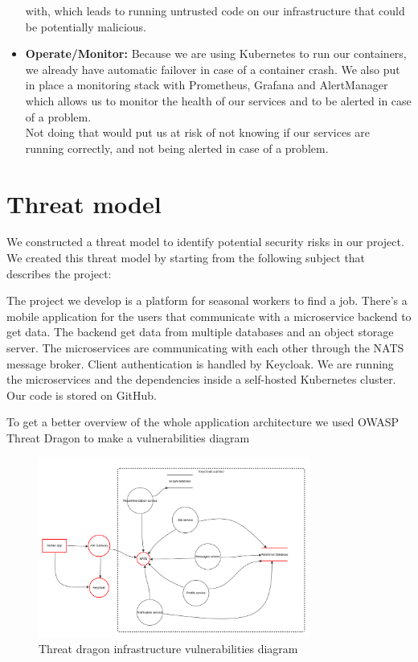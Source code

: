 \documentclass[12pt,x11names]{article}
\begin{document}
\begin{itemize}
    with, which leads to running untrusted code on our infrastructure that could be
    potentially malicious.
    \item \textbf{Operate/Monitor:} Because we are using Kubernetes to run our
    containers, we already have automatic failover in case of a container crash. We
    also put in place a monitoring stack with Prometheus, Grafana and AlertManager which
    allows us to monitor the health of our services and to be alerted in case of a problem.
    \medskip \\
    Not doing that would put us at risk of not knowing if our services are running
    correctly, and not being alerted in case of a problem.
\end{itemize}

\section{Threat model}

We constructed a threat model to identify potential security risks in our project. We 
created this threat model by starting from the following subject that describes the 
project:

\medskip
The project we develop is a platform for seasonal workers to find a job. There's a mobile 
application for the users that communicate with a microservice backend to get data. The 
backend get data from multiple databases and an object storage server. The microservices
are communicating with each other through the NATS message broker. Client authentication 
is handled by Keycloak. We are running the microservices and the dependencies inside a 
self-hosted Kubernetes cluster. Our code is stored on GitHub.

\medskip
To get a better overview of the whole application architecture we used OWASP Threat Dragon
to make a vulnerabilities diagram

\begin{figure}[H]
  \centering
  \includegraphics[width=0.8\textwidth]{imgs/threat_dragon.png}
  \caption{Threat dragon infrastructure vulnerabilities diagram}
\end{figure}
\end{document}
